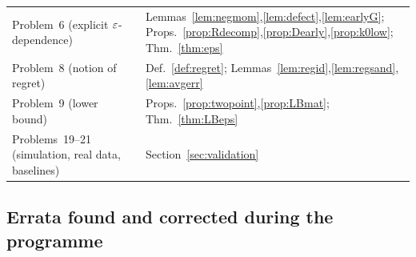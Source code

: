 \begin{center}
\begin{tabular}{@{}p{5.6cm}p{7.5cm}@{}}
Problem~6 (explicit $\varepsilon$-dependence) & Lemmas~\ref{lem:negmom},\ref{lem:defect},\ref{lem:earlyG}; Props.~\ref{prop:Rdecomp},\ref{prop:Dearly},\ref{prop:k0low}; Thm.~\ref{thm:eps}\\
Problem~8 (notion of regret) & Def.~\ref{def:regret}; Lemmas~\ref{lem:regid},\ref{lem:regsand},\ref{lem:avgerr}\\
Problem~9 (lower bound) & Props.~\ref{prop:twopoint},\ref{prop:LBmat}; Thm.~\ref{thm:LBeps}\\
Problems~19--21 (simulation, real data, baselines) & Section~\ref{sec:validation}\\\bottomrule
\end{tabular}
\end{center}

\subsection{Errata found and corrected during the programme}

